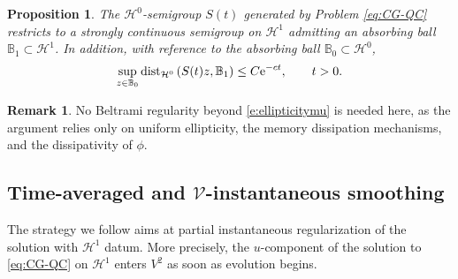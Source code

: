 \documentclass[12pt,leqno]{amsart}
\def\e{{\rm e}}
\def\dist{{\rm dist}}
\newtheorem{proposition}[theorem]{Proposition}
\theoremstyle{definition}
\newtheorem{remark}[theorem]{Remark}
\numberwithin{equation}{section}
\numberwithin{figure}{section}
\begin{document}
 

\begin{proposition} \label{prop:main-H1-link}
The $\mathcal H^{0}$-semigroup $S(t)$ generated by Problem \eqref{eq:CG-QC} restricts to a strongly continuous semigroup on $\mathcal H^{1}$
admitting an absorbing ball $\mathbb B_{1}\subset\mathcal H^{1}$.
In addition, with reference to the absorbing ball $\mathbb B_{0}\subset\mathcal H^{0}$,
\begin{equation}\label{eq:link} \sup_{z\in \mathbb B_0}
\dist_{\mathcal H^0}\left(S(t)z,\mathbb{B}_{1}\right)\le C\e^{-c t}, \qquad t>0.
\end{equation}
\end{proposition}

\begin{remark} \label{rem:tool-link} No Beltrami regularity beyond \eqref{e:ellipticitymu} is needed here, as the argument relies only on
uniform ellipticity, the memory dissipation mechanisms, and the dissipativity of $\phi$.
\end{remark}

\subsection{Time-averaged and $\mathcal V$-instantaneous smoothing}\label{subsec:main-smoothing}
The strategy we follow aims at partial instantaneous regularization of the solution with $\mathcal H^1$ datum.
 More precisely, the $u$-component of the solution to \eqref{eq:CG-QC} on $\mathcal H^1$ enters ${V^2}$ as soon as evolution begins. 
 
\end{document}
